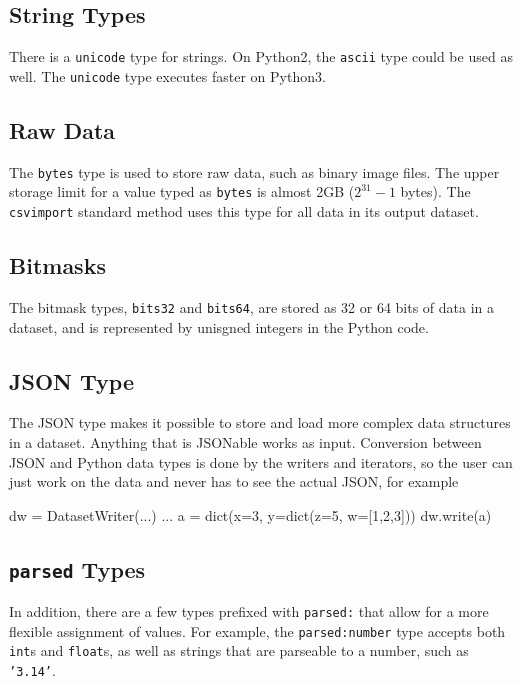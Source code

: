 \subsection{String Types}
There is a \texttt{unicode} type for strings.  On Python2, the
\texttt{ascii} type could be used as well.  The \texttt{unicode}
type executes faster on Python3.


\subsection{Raw Data}

The \texttt{bytes} type is used to store raw data, such as binary
image files.  The upper storage limit for a value typed
as \texttt{bytes} is almost 2GB ($2^{31}-1$ bytes).
The \texttt{csvimport} standard method uses this type for all data in
its output dataset.


\subsection{Bitmasks}
The bitmask types, \texttt{bits32} and \texttt{bits64}, are stored as
32 or 64 bits of data in a dataset, and is represented by unisgned
integers in the Python code.


\subsection{JSON Type}
The JSON type makes it possible to store and load more complex data
structures in a dataset.  Anything that is JSONable works as input.
Conversion between JSON and Python data types is done by the writers
and iterators, so the user can just work on the data and never has to
see the actual JSON, for example
\begin{python}
    dw = DatasetWriter(...)
    ...
    a = dict(x=3, y=dict(z=5, w=[1,2,3]))
    dw.write(a)
\end{python}



\subsection{\texttt{parsed} Types}
In addition, there are a few types prefixed with \texttt{parsed:} that
allow for a more flexible assignment of values.  For example,
the \texttt{parsed:number} type accepts both \texttt{int}s
and \texttt{float}s, as well as strings that are parseable to a
number, such as \texttt{'3.14'}.



